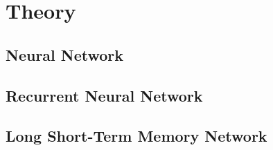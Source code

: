 \section{Theory} %


\subsection{Neural Network}
	
\subsection{Recurrent Neural Network}



\subsection{Long Short-Term Memory Network}

